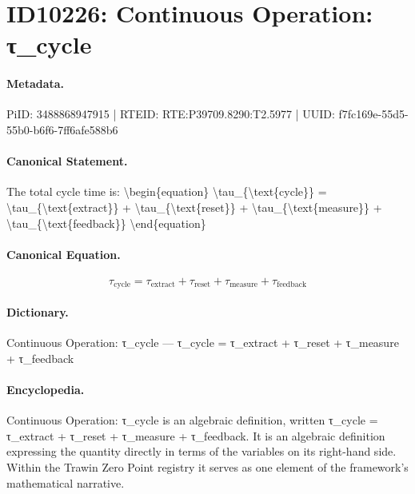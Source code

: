 \section*{ID10226: Continuous Operation: τ\_cycle}
\paragraph{Metadata.}
PiID: 3488868947915 | RTEID: RTE:P39709.8290:T2.5977 | UUID: f7fc169e-55d5-55b0-b6f6-7ff6afe588b6

\paragraph{Canonical Statement.}
The total cycle time is: \textbackslash{}begin\{equation\} \textbackslash{}tau\_\{\textbackslash{}text\{cycle\}\} = \textbackslash{}tau\_\{\textbackslash{}text\{extract\}\} + \textbackslash{}tau\_\{\textbackslash{}text\{reset\}\} + \textbackslash{}tau\_\{\textbackslash{}text\{measure\}\} + \textbackslash{}tau\_\{\textbackslash{}text\{feedback\}\} \textbackslash{}end\{equation\}

\paragraph{Canonical Equation.}
\[
\tau_{\text{cycle}} = \tau_{\text{extract}} + \tau_{\text{reset}} + \tau_{\text{measure}} + \tau_{\text{feedback}}
\]

\paragraph{Dictionary.}
Continuous Operation: τ\_cycle — τ\_cycle = τ\_extract + τ\_reset + τ\_measure + τ\_feedback

\paragraph{Encyclopedia.}
Continuous Operation: τ\_cycle is an algebraic definition, written τ\_cycle = τ\_extract + τ\_reset + τ\_measure + τ\_feedback. It is an algebraic definition expressing the quantity directly in terms of the variables on its right-hand side. Within the Trawin Zero Point registry it serves as one element of the framework's mathematical narrative.

